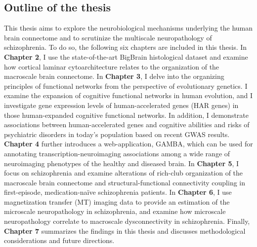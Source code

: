 \begin{refsection}
\section*{Outline of the thesis}
This thesis aims to explore the neurobiological mechanisms underlying the human brain connectome and to scrutinize the multiscale neuropathology of schizophrenia. To do so, the following six chapters are included in this thesis. In \textbf{Chapter 2}, I use the state-of-the-art BigBrain histological dataset \citep{amunts2013bigbrain} and examine how cortical laminar cytoarchitecture relates to the organization of the macroscale brain connectome. In \textbf{Chapter 3}, I delve into the organizing principles of functional networks from the perspective of evolutionary genetics. I examine the expansion of cognitive functional networks in human evolution, and I investigate gene expression levels of human-accelerated genes (HAR genes) in those human-expanded cognitive functional networks. In addition, I demonstrate associations between human-accelerated genes and cognitive abilities and risks of psychiatric disorders in today's population based on recent GWAS results. \textbf{Chapter 4} further introduces a web-application, GAMBA, which can be used for annotating transcription-neuroimaging associations among a wide range of neuroimaging phenotypes of the healthy and diseased brain. In \textbf{Chapter 5}, I focus on schizophrenia and examine alterations of rich-club organization of the macroscale brain connectome and structural-functional connectivity coupling in first-episode, medication-naïve schizophrenia patients. In \textbf{Chapter 6}, I use magnetization transfer (MT) imaging data to provide an estimation of the microscale neuropathology in schizophrenia, and examine how microscale neuropathology correlate to macroscale dysconnectivity in schizophrenia. Finally, \textbf{Chapter 7} summarizes the findings in this thesis and discusses methodological considerations and future directions.

\printbibliography[heading=subbibliography]

\end{refsection}